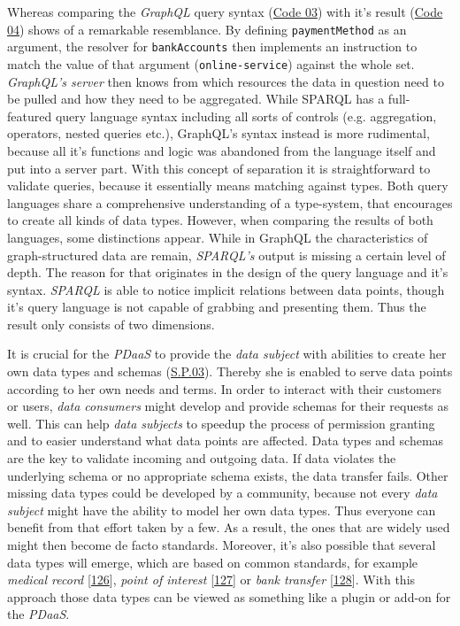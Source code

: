 \documentclass[12pt,english,a4paper,titlepage,cleardoublepage=empty,dottedtoc]{report}
\begin{document}
Whereas comparing the \emph{GraphQL} query syntax
(\protect\hyperlink{code-03_graphql-query}{Code 03}) with it's result
(\protect\hyperlink{code-04_graphql-query-result}{Code 04}) shows of a
remarkable resemblance. By defining \texttt{paymentMethod} as an
argument, the resolver for \texttt{bankAccounts} then implements an
instruction to match the value of that argument
(\texttt{\textquotesingle{}online-service\textquotesingle{}}) against
the whole set. \emph{GraphQL's server} then knows from which resources
the data in question need to be pulled and how they need to be
aggregated. While SPARQL has a full-featured query language syntax
including all sorts of controls (e.g. aggregation, operators, nested
queries etc.), GraphQL's syntax instead is more rudimental, because all
it's functions and logic was abandoned from the language itself and put
into a server part. With this concept of separation it is
straightforward to validate queries, because it essentially means
matching against types. Both query languages share a comprehensive
understanding of a type-system, that encourages to create all kinds of
data types. However, when comparing the results of both languages, some
distinctions appear. While in GraphQL the characteristics of
graph-structured data are remain, \emph{SPARQL's} output is missing a
certain level of depth. The reason for that originates in the design of
the query language and it's syntax. \emph{SPARQL} is able to notice
implicit relations between data points, though it's query language is
not capable of grabbing and presenting them. Thus the result only
consists of two dimensions.

It is crucial for the \emph{PDaaS} to provide the \emph{data subject}
with abilities to create her own data types and schemas
(\protect\hyperlink{sp03}{S.P.03}). Thereby she is enabled to serve data
points according to her own needs and terms. In order to interact with
their customers or users, \emph{data consumers} might develop and
provide schemas for their requests as well. This can help \emph{data
subjects} to speedup the process of permission granting and to easier
understand what data points are affected. Data types and schemas are the
key to validate incoming and outgoing data. If data violates the
underlying schema or no appropriate schema exists, the data transfer
fails. Other missing data types could be developed by a community,
because not every \emph{data subject} might have the ability to model
her own data types. Thus everyone can benefit from that effort taken by
a few. As a result, the ones that are widely used might then become de
facto standards. Moreover, it's also possible that several data types
will emerge, which are based on common standards, for example
\emph{medical record}
{[}\protect\hyperlink{ref-web_spec_data-schemas_ehr}{126}{]},
\emph{point of interest}
{[}\protect\hyperlink{ref-web_spec_data-schemas_poi}{127}{]} or
\emph{bank transfer}
{[}\protect\hyperlink{ref-web_spec_data-schemas_bank-transfer}{128}{]}.
With this approach those data types can be viewed as something like a
plugin or add-on for the \emph{PDaaS}.
\end{document}
